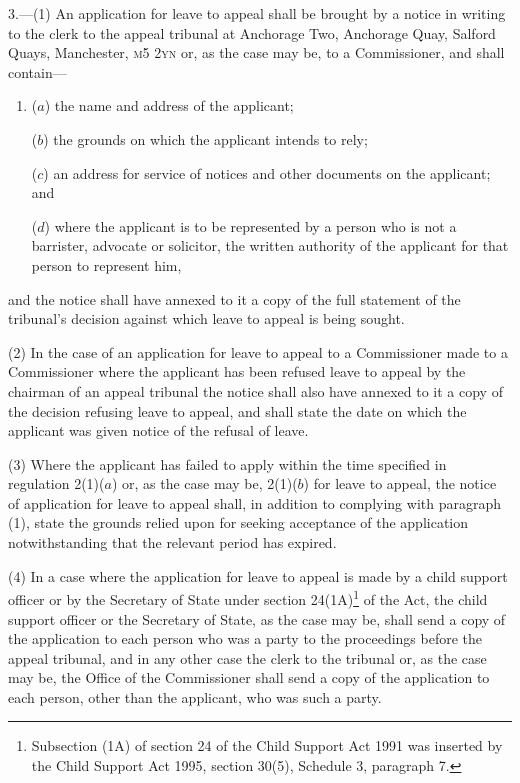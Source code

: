 \documentclass[12pt,a4paper]{article}
\begin{document}
3.—(1) An application for leave to appeal shall be brought by a notice in writing to the clerk to the 
appeal tribunal  %
at Anchorage Two, Anchorage Quay, Salford Quays, Manchester, \textsc{\lowercase{M5 2YN}} or, as the case may be, to a Commissioner, and shall contain—
\begin{enumerate}\item[]
($a$) the name and address of the applicant;

($b$) the grounds on which the applicant intends to rely;

($c$) an address for service of notices and other documents on the applicant; and

($d$) where the applicant is to be represented by a person who is not a barrister, advocate or solicitor, the written authority of the applicant for that person to represent him,
\end{enumerate}
and the notice shall have annexed to it 
a copy of the full statement of the tribunal’s decision against which leave to appeal is being sought.  %

(2) In the case of an application for leave to appeal to a Commissioner made to a Commissioner where the applicant has been refused leave to appeal by the chairman of an appeal tribunal the notice shall also have annexed to it a copy of the decision refusing leave to appeal, and shall state the date on which the applicant was given notice of the refusal of leave.

(3) Where the applicant has failed to apply within the time specified in regulation 2(1)($a$) or, as the case may be, 2(1)($b$) for leave to appeal, the notice of application for leave to appeal shall, in addition to complying with paragraph (1), state the grounds relied upon for seeking acceptance of the application notwithstanding that the relevant period has expired.

(4) In a case where the application for leave to appeal is made by 
a child support officer or by the Secretary of State under section 24(1A)\footnote{\frenchspacing Subsection (1A) of section 24 of the Child Support Act 1991 was inserted by the Child Support Act 1995, section 30(5), Schedule 3, paragraph 7.} of the Act, the child support officer or the Secretary of State, as the case may be,  %
shall send a copy of the application to each person who was a party to the proceedings before the appeal tribunal, and in any other case the clerk to the tribunal or, as the case may be, the Office of the Commissioner shall send a copy of the application to each person, other than the applicant, who was such a party.
\end{document}
